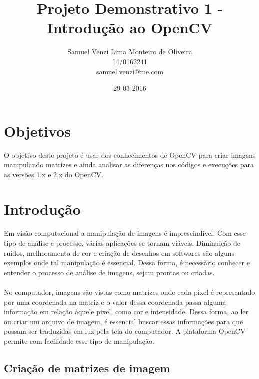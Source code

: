 \documentclass{article}
\begin{document}
\title{Projeto Demonstrativo 1 - Introdução ao OpenCV}
\date{29-03-2016}
\author{Samuel Venzi Lima Monteiro de Oliveira\\14/0162241\\samuel.venzi@me.com}

	\maketitle

	\section{Objetivos}

	O objetivo deste projeto é usar dos conhecimentos de OpenCV para criar imagens manipulando matrizes e ainda analisar as diferenças nos códigos e execuções para as versões 1.x e 2.x do OpenCV.

	\section{Introdução}

	\paragraph{}
	Em visão computacional a manipulação de imagens é imprescindível. Com esse tipo de análise e processo, várias aplicações se tornam viáveis. Diminuição de ruídos, melhoramento de cor e criação de desenhos em softwares são alguns exemplos onde tal manipulação é essencial. Dessa forma, é necessário conhecer e entender o processo de análise de imagens, sejam prontas ou criadas.
	\paragraph{}
	No computador, imagens são vistas como matrizes onde cada pixel é representado por uma coordenada na matriz e o valor dessa coordenada passa alguma informação em relação àquele pixel, como cor e intensidade. Dessa forma, ao ler ou criar um arquivo de imagem, é essencial buscar essas informações para que possam ser traduzidas em luz pela tela do computador. A plataforma OpenCV permite com facilidade esse tipo de manipulação.

	\subsection{Criação de matrizes de imagem}
\end{document}

